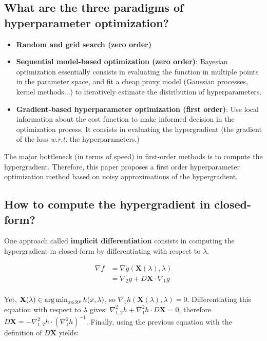 \documentclass[a4paper,10pt]{article}
\theoremstyle{definition}
\begin{document}
\subsection*{What are the three paradigms of hyperparameter optimization?}

\begin{itemize}
    \item \textbf{Random and grid search (zero order)}
    \item \textbf{Sequential model-based optimization (zero order)}: Bayesian optimization essentially consists in evaluating the function in multiple points in the parameter space, and fit a cheap proxy model
                  (Gaussian processes, kernel methods...) to iteratively estimate the distribution of hyperparameters.
    \item \textbf{Gradient-based hyperparameter optimization (first order)}: Use local information about the cost function to make informed decision
                  in the optimization process. It consists in evaluating the hypergradient (the gradient of the loss \textit{w.r.t.} the hyperparameters.)
\end{itemize}

The major bottleneck (in terms of speed) in first-order methods is to compute the hypergradient.
Therefore, this paper proposes a first order hyperparameter optimization method based on noisy approximations of the hypergradient.

\subsection*{How to compute the hypergradient in closed-form?}

One approach called \textbf{implicit differentiation} consists in computing the hypergradient in closed-form by differentiating with respect to $\lambda$.

\begin{align*}
    \nabla f &= \nabla g(\mathbf{X}(\lambda), \lambda) \\
             &= \nabla_2 g + D\mathbf{X} \cdot \nabla_1 g
\end{align*}
\\
Yet, $\mathbf{X}(\lambda) \in \operatorname*{arg\,min}_{x \in \mathbb{R}^p} h(x, \lambda)$, so $\nabla_1 h(\mathbf{X}(\lambda), \lambda)=0$. Differentiating this equation with respect to $\lambda$
gives: $\nabla_{1, 2}^2 h + \nabla^2_1 h \cdot D\mathbf{X} = 0$, therefore $D\mathbf{X} = - \nabla^2_{1,2}h \cdot (\nabla_1^2 h)^{-1}$.  Finally, using the previous equation with
the definition of $D\mathbf{X}$ yields:
\end{document}
